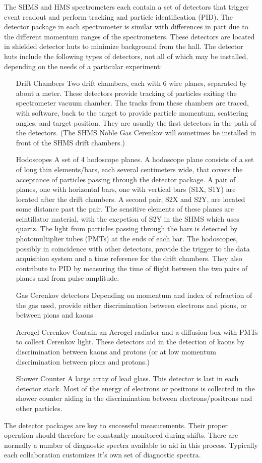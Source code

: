 The SHMS and HMS spectrometers each contain a set of detectors that
trigger event readout and perform tracking and particle identification
(PID).  The detector package in each spectrometer is similar with
differences in part due to the different momentum ranges of the
spectrometers.  These detectors are located in shielded detector huts
to minimize background from the hall.  The detector huts include the
following types of detectors, not all of which may be installed,
depending on the needs of a particular experiment:
\begin{itemize}
\item[Drift Chambers]Two drift chambers, each with 6 wire planes,
separated by about a meter.  These detectors provide tracking of
particles exiting the spectrometer vacuum chamber.  The tracks from
these chambers are traced, with software, back to the target to
provide particle momentum, scattering
angles, and target position.  They are usually the first detectors
in the path of the detectors.  (The SHMS Noble Gas Cerenkov will
sometimes be installed in front of the SHMS drift chambers.)
\item[Hodoscopes]A set of 4 hodoscope planes.  A hodoscope plane
consists of a set of long thin elements/bars, each several centimeters
wide, that covers the acceptance of particles passing through the
detector package.  A pair of planes, one with horizontal bars, one
with vertical bars (S1X, S1Y) are located after the drift chambers.  A
second pair, S2X and S2Y, are located some distance past the pair.
The sensitive elements of these planes are scintillator material, with
the excpetion of S2Y in the SHMS which uses quartz.  The light from
particles passing through the bars is detected by photomultiplier
tubes (PMTs) at the ends of each bar.  The hodoscopes, possibly in
coincidence with other detectors, provide the trigger to the data
acquisition system and a time reference for the drift chambers.
They also contribute to PID by measuring the time of
flight between the two pairs of planes and from pulse amplitude.
\item[Gas Cerenkov detectors]Depending on momentum and index of
refraction of the gas used, provide either discrimination between
electrons and pions, or between pions and kaons
\item[Aerogel Cerenkov]Contain an Aerogel radiator and a diffusion box
  with PMTs to collect Cerenkov light.  These detectors aid in the
  detection of kaons by  discrimination between kaons
and protons (or at low momentum discrimination between pions and
protons.)
\item[Shower Counter]A large array of lead glass.  This detector is
  last in each detector stack.  Most of the energy of electrons or
  positrons is
  collected in the shower counter aiding in the discrimination between
  electrons/positrons and other particles.
\end{itemize}
\cite{CDR12GeV}

The detector packages are key to successful measurements.  Their
proper operation should therefore be constantly monitored during
shifts. There are normally a number of diagnostic spectra available to
aid in this process.  Typically each collaboration customizes it's own
set of diagnostic spectra.

